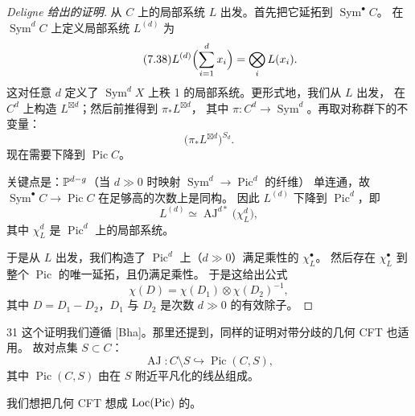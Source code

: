 \begin{proof}[Deligne 给出的证明]
从 $C$ 上的局部系统 $L$ 出发。首先把它延拓到 $\operatorname{Sym}^{\bullet}C$。
在 $\operatorname{Sym}^d C$ 上定义局部系统 $L^{(d)}$ 为
\begin{equation}\tag{7.38}\label{eq:7.38}
L^{(d)}\Bigl(\sum_{i=1}^{d}x_i\Bigr)=\bigotimes_i L(x_i).
\end{equation}
这对任意 $d$ 定义了 $\operatorname{Sym}^d X$ 上秩 1 的局部系统。更形式地，我们从 $L$ 出发，
在 $C^d$ 上构造 $L^{\boxtimes d}$；然后前推得到 $\pi_*L^{\boxtimes d}$，
其中 $\pi\colon C^d\to\operatorname{Sym}^d$。再取对称群下的不变量：
\begin{equation}\tag{7.39}\label{eq:7.39}
\bigl(\pi_*L^{\boxtimes d}\bigr)^{S_d}.
\end{equation}
现在需要下降到 $\operatorname{Pic}C$。

关键点是：$\mathbb{P}^{d-g}$（当 $d\gg 0$ 时映射 $\operatorname{Sym}^d\to\operatorname{Pic}^d$ 的纤维）
单连通，故 $\operatorname{Sym}^{\bullet}C\to\operatorname{Pic}C$ 在足够高的次数上是同构。
因此 $L^{(d)}$ 下降到 $\operatorname{Pic}^d$，即
\begin{equation}\tag{7.40}\label{eq:7.40}
L^{(d)}\simeq\operatorname{AJ}^{d*}\bigl(\chi_L^d\bigr),
\end{equation}
其中 $\chi_L^d$ 是 $\operatorname{Pic}^d$ 上的局部系统。

于是从 $L$ 出发，我们构造了 $\operatorname{Pic}^d$ 上（$d\gg 0$）满足乘性的 $\chi_L^{\bullet}$。
然后存在 $\chi_L^{\bullet}$ 到整个 $\operatorname{Pic}$ 的唯一延拓，且仍满足乘性。
于是这给出公式
\begin{equation}\tag{7.41}\label{eq:7.41}
\chi(D)=\chi(D_1)\otimes\chi(D_2)^{-1},
\end{equation}
其中 $D=D_1-D_2$，$D_1$ 与 $D_2$ 是次数 $d\gg 0$ 的有效除子。
\end{proof}

\begin{srcrem}{31}
这个证明我们遵循 [Bha]。那里还提到，同样的证明对带分歧的几何 CFT 也适用。
故对点集 $S\subset C$：
\begin{equation}\tag{7.42}\label{eq:7.42}
\operatorname{AJ}\colon C\setminus S\hookrightarrow\operatorname{Pic}(C,S),
\end{equation}
其中 $\operatorname{Pic}(C,S)$ 由在 $S$ 附近平凡化的线丛组成。
\end{srcrem}

我们想把几何 CFT 想成 $\mathrm{Loc}(\operatorname{Pic})$ 的。

